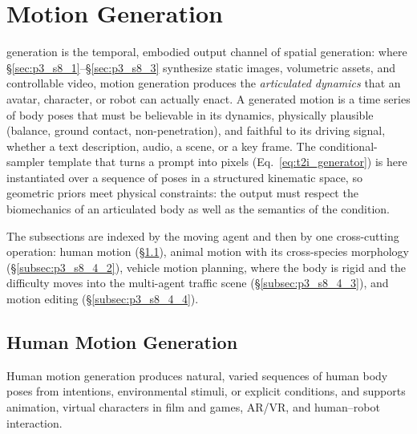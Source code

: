 

\section{Motion Generation}
\label{sec:p3_s8_4}

 generation is the temporal, embodied output channel of spatial generation: where §\ref{sec:p3_s8_1}–§\ref{sec:p3_s8_3} synthesize static images, volumetric assets, and controllable video, motion generation produces the \emph{articulated dynamics} that an avatar, character, or robot can actually enact.
A generated motion is a time series of body poses that must be believable in its dynamics, physically plausible (balance, ground contact, non-penetration), and faithful to its driving signal, whether a text description, audio, a scene, or a key frame.
The conditional-sampler template that turns a prompt into pixels (Eq.~\eqref{eq:t2i_generator}) is here instantiated over a sequence of poses in a structured kinematic space, so geometric priors meet physical constraints: the output must respect the biomechanics of an articulated body as well as the semantics of the condition.

The subsections are indexed by the moving agent and then by one cross-cutting operation: human motion (§\ref{subsec:p3_s8_4_1}), animal motion with its cross-species morphology (§\ref{subsec:p3_s8_4_2}), vehicle motion planning, where the body is rigid and the difficulty moves into the multi-agent traffic scene (§\ref{subsec:p3_s8_4_3}), and motion editing (§\ref{subsec:p3_s8_4_4}).




\subsection{Human Motion Generation}
\label{subsec:p3_s8_4_1}
Human motion generation produces natural, varied sequences of human body poses from intentions, environmental stimuli, or explicit conditions, and supports animation, virtual characters in film and games, AR/VR, and human--robot interaction.

